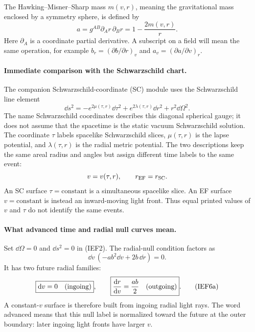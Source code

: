 The Hawking--Misner--Sharp mass \(m(v,r)\), meaning the gravitational mass
enclosed by a symmetry sphere, is defined by
\[
 a=g^{AB}\partial_A r\,\partial_B r
   =1-\frac{2m(v,r)}{r}.                                  \tag{IEF5}
\]
Here \(\partial_A\) is a coordinate partial derivative.  A subscript on a
field will mean the same operation, for example
\(b_r=(\partial b/\partial r)_v\) and
\(a_v=(\partial a/\partial v)_r\).

\paragraph{Immediate comparison with the Schwarzschild chart.}
The companion Schwarzschild-coordinate (SC) module uses the Schwarzschild
line element
\[
 \dd s^2=-e^{2\mu(\tau,r)}\dd\tau^2
          +e^{2\lambda(\tau,r)}\dd r^2+r^2\dd\Omega^2.    \tag{IEF38}
\]
The name Schwarzschild coordinates describes this diagonal spherical gauge;
it does not assume that the spacetime is the static vacuum Schwarzschild
solution.  The coordinate \(\tau\) labels spacelike Schwarzschild slices,
\(\mu(\tau,r)\) is the lapse potential, and \(\lambda(\tau,r)\) is the radial
metric potential.  The two descriptions keep the same areal radius and
angles but assign different time labels to the same event:
\[
       v=v(\tau,r),\qquad r_{\rm EF}=r_{\rm SC}.
\]
An SC surface \(\tau=\mathrm{constant}\) is a simultaneous spacelike slice.
An EF surface \(v=\mathrm{constant}\) is instead an inward-moving light
front.  Thus equal printed values of \(v\) and \(\tau\) do not identify the
same events.

\paragraph{What advanced time and radial null curves mean.}
Set \(\dd\Omega=0\) and \(\dd s^2=0\) in (IEF2).  The radial-null condition
factors as
\[
 \dd v\,(-ab^2\dd v+2b\,\dd r)=0.
\]
It has two future radial families:
\[
 \boxed{\mathrm d v=0\quad\hbox{(ingoing)}},\qquad
 \boxed{\frac{\mathrm d r}{\mathrm d v}=\frac{ab}{2}
        \quad\hbox{(outgoing)}}.                          \tag{IEF6a}
\]
A constant-\(v\) surface is therefore built from ingoing radial light rays.
The word advanced means that this null label is normalized toward the future
at the outer boundary: later ingoing light fronts have larger \(v\).

